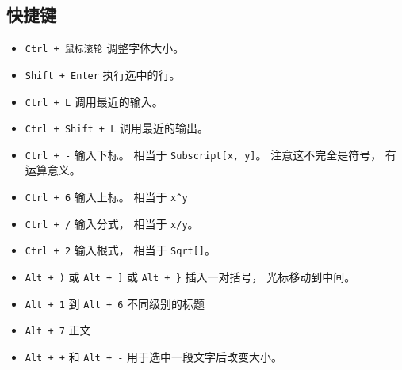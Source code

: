 \subsection{快捷键}
\begin{itemize}
\item \verb|Ctrl + 鼠标滚轮| 调整字体大小。
\item \verb|Shift + Enter| 执行选中的行。
\item \verb|Ctrl + L| 调用最近的输入。
\item \verb|Ctrl + Shift + L| 调用最近的输出。
\item \verb|Ctrl + -| 输入下标。 相当于 \verb|Subscript[x, y]|。 注意这不完全是符号， 有运算意义。
\item \verb|Ctrl + 6| 输入上标。 相当于 \verb|x^y|
\item \verb|Ctrl + /| 输入分式， 相当于 \verb|x/y|。
\item \verb|Ctrl + 2| 输入根式， 相当于 \verb|Sqrt[]|。
\item \verb|Alt + )| 或 \verb|Alt + ]| 或 \verb|Alt + }| 插入一对括号， 光标移动到中间。
\item \verb|Alt + 1| 到 \verb|Alt + 6| 不同级别的标题
\item \verb|Alt + 7| 正文
\item \verb|Alt + +| 和 \verb|Alt + -| 用于选中一段文字后改变大小。
\end{itemize}

